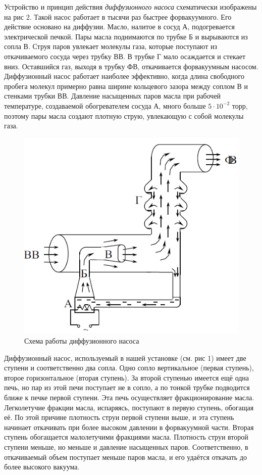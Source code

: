 \documentclass[12pt,a4paper]{article}
\begin{document}
Устройство и принцип действия \textit{диффузионного насоса} схематически изображены на рис 2. Такой насос работает в тысячи раз быстрее форвакуумного. Его действие основано на диффузии. Масло, налитое в сосуд А, подогревается электрической печкой. Пары масла поднимаются по трубке Б и вырываются из сопла В. Струя паров увлекает молекулы газа, которые поступают из откачиваемого сосуда через трубку ВВ. В трубке Г мало осаждается и стекает вниз. Оставшийся газ, выходя в трубку ФВ, откачивается форвакуумным насосом. \\
Диффузионный насос работает наиболее эффективно, когда длина свободного пробега молекул примерно равна ширине кольцевого зазора между соплом В и стенками трубки ВВ. Давление насыщенных паров масла при рабочей температуре, создаваемой обогревателем сосуда А, много больше $5\cdot 10^{-2}$ торр, поэтому пары масла создают плотную струю, увлекающую с собой молекулы газа.
\begin{figure}[!h]
	\centering
	\includegraphics[width=0.4\linewidth]{"вв.png"}
	\caption[]{Схема работы диффузионного насоса}
	\label{fig:Схема ВВ насоса}
\end{figure}
 Диффузионный насос, используемый в нашей установке (см. рис 1) имеет две ступени и соответственно два сопла. Одно сопло вертикальное (первая ступень), второе горизонтальное (вторая ступень). За второй ступенью имеется ещё одна печь, но пар из этой печи поступает не в сопло, а по тонкой трубке подводится ближе к печке первой ступени. Эта печь осуществляет фракционирование масла. Легколетучие фракции масла, испаряясь, поступают в первую ступень, обогащая её. По этой причине плотность струи первой ступени выше, и эта ступень начинает откачивать при более высоком давлении в форвакуумной части. Вторая ступень обогащается малолетучими фракциями масла. Плотность струи второй ступени меньше, но меньше и давление насыщенных паров. Соответственно, в откачиваемый объем поступает меньше паров масла, и его удаётся откачать до более высокого вакуума.  \\
\end{document}

